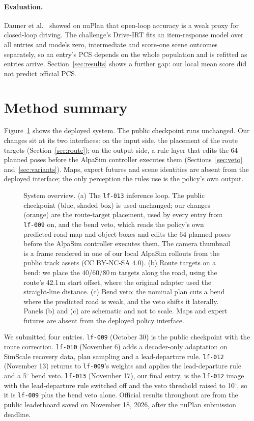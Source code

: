 \documentclass{article}
\newcommand{\lf}{\texttt{lf-009}}
\begin{document}
\paragraph{Evaluation.}
Dauner et al.\ \cite{pdm} showed on nuPlan that open-loop accuracy is a weak proxy for closed-loop driving. The challenge's Drive-IRT \cite{driveirt} fits an item-response model over all entries and models zero, intermediate and score-one scene outcomes separately, so an entry's PCS depends on the whole population and is refitted as entries arrive. Section~\ref{sec:results} shows a further gap: our local mean score did not predict official PCS.

\section{Method summary}\label{sec:summary}
Figure~\ref{fig:overview} shows the deployed system. The public checkpoint runs unchanged. Our changes sit at its two interfaces: on the input side, the placement of the route targets (Section~\ref{sec:route}); on the output side, a rule layer that edits the 64 planned poses before the AlpaSim controller executes them (Sections~\ref{sec:veto} and~\ref{sec:variants}). Maps, expert futures and scene identities are absent from the deployed interface; the only perception the rules use is the policy's own output.

\begin{figure}[htbp]
\centering

\caption{System overview. (a) The \texttt{lf-013} inference loop. The public checkpoint (blue, shaded box) is used unchanged; our changes (orange) are the route-target placement, used by every entry from \lf{} on, and the bend veto, which reads the policy's own predicted road map and object boxes and edits the 64 planned poses before the AlpaSim controller executes them. The camera thumbnail is a frame rendered in one of our local AlpaSim rollouts from the public track assets \cite{trackdata} (CC BY-NC-SA 4.0). (b) Route targets on a bend: we place the 40/60/80\,m targets along the road, using the route's 42.1\,m start offset, where the original adapter used the straight-line distance. (c) Bend veto: the nominal plan cuts a bend where the predicted road is weak, and the veto shifts it laterally. Panels (b) and (c) are schematic and not to scale. Maps and expert futures are absent from the deployed policy interface.}\label{fig:overview}
\end{figure}

We submitted four entries. \lf{} (October 30) is the public checkpoint with the route correction. \texttt{lf-010} (November 6) adds a decoder-only adaptation on SimScale recovery data, plan sampling and a lead-departure rule. \texttt{lf-012} (November 13) returns to \lf{}'s weights and applies the lead-departure rule and a 5$^\circ$ bend veto. \texttt{lf-013} (November 17), our final entry, is the \texttt{lf-012} image with the lead-departure rule switched off and the veto threshold raised to 10$^\circ$, so it is \lf{} plus the bend veto alone. Official results throughout are from the public leaderboard saved on November 18, 2026, after the nuPlan submission deadline.
\end{document}
